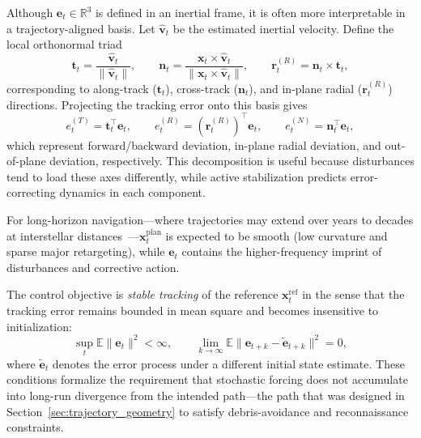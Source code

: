 \documentclass{article}
\begin{document}
Although $\mathbf{e}_t\in\mathbb{R}^3$ is defined in an inertial frame, it is often more interpretable in a trajectory-aligned basis. Let $\hat{\mathbf{v}}_t$ be the estimated inertial velocity. Define the local orthonormal triad
\begin{equation}
\label{eq:tnr_triad}
\mathbf{t}_t=\frac{\hat{\mathbf{v}}_t}{\|\hat{\mathbf{v}}_t\|},\qquad
\mathbf{n}_t=\frac{\mathbf{x}_t\times\hat{\mathbf{v}}_t}{\|\mathbf{x}_t\times\hat{\mathbf{v}}_t\|},\qquad
\mathbf{r}_t^{(R)}=\mathbf{n}_t\times\mathbf{t}_t,
\end{equation}
corresponding to along-track ($\mathbf{t}_t$), cross-track ($\mathbf{n}_t$), and in-plane radial ($\mathbf{r}_t^{(R)}$) directions. Projecting the tracking error onto this basis gives
\begin{equation}
\label{eq:error_components}
e_t^{(T)}=\mathbf{t}_t^\top\mathbf{e}_t,\qquad
e_t^{(R)}=\left(\mathbf{r}_t^{(R)}\right)^\top\mathbf{e}_t,\qquad
e_t^{(N)}=\mathbf{n}_t^\top\mathbf{e}_t,
\end{equation}
which represent forward/backward deviation, in-plane radial deviation, and out-of-plane deviation, respectively. This decomposition is useful because disturbances tend to load these axes differently, while active stabilization predicts error-correcting dynamics in each component.


For long-horizon navigation---where trajectories may extend over years to decades at interstellar distances~\cite{jewitt2022interstellar}---$\mathbf{x}^{\mathrm{plan}}_t$ is expected to be smooth (low curvature and sparse major retargeting), while $\mathbf{e}_t$ contains the higher-frequency imprint of disturbances and corrective action.

The control objective is \emph{stable tracking} of the reference $\mathbf{x}^{\mathrm{ref}}_t$ in the sense that the tracking error remains bounded in mean square and becomes insensitive to initialization:
\begin{equation}
\sup_t \mathbb{E}\|\mathbf{e}_t\|^2 < \infty,
\qquad
\lim_{k\to\infty}\mathbb{E}\|\mathbf{e}_{t+k}-\tilde{\mathbf{e}}_{t+k}\|^2 = 0,
\label{eq:stability_objective}
\end{equation}
where $\tilde{\mathbf{e}}_t$ denotes the error process under a different initial state estimate. These conditions formalize the requirement that stochastic forcing does not accumulate into long-run divergence from the intended path---the path that was designed in Section~\ref{sec:trajectory_geometry} to satisfy debris-avoidance and reconnaissance constraints.
\end{document}
